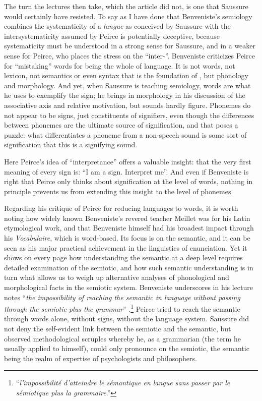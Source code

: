 \documentclass[output=paper]{langscibook}
\begin{document}
The turn the lectures then take, which the article did not, is one that Saussure would certainly have resisted. To say as I have done that Benveniste's semiology combines the systematicity of a \emph{langue} as conceived by Saussure with the intersystematicity assumed by Peirce is potentially deceptive, because systematicity must be understood in a strong sense for Saussure, and in a weaker sense for Peirce, who places the stress on the ``inter-''. Benveniste criticizes Peirce for ``mistaking'' words for being the whole of language. It is not words, not lexicon, not semantics or even syntax that is the foundation of , but phonology and morphology. And yet, when Saussure is teaching semiology, words are what he uses to exemplify the sign; he brings in morphology in his discussion of the associative axis and relative motivation, but sounds hardly figure. Phonemes do not appear to be signs, just constituents of signifiers, even though the differences between phonemes are the ultimate source of signification, and that poses a puzzle: what differentiates a phoneme from a non-speech sound is some sort of signification that this is a signifying sound.

Here Peirce's idea of ``interpretance'' offers a valuable insight: that the very first meaning of every sign is: ``I am a sign. Interpret me''. And even if Benveniste is right that Peirce only thinks about signification at the level of words, nothing in principle prevents us from extending this insight to the level of phonemes.

Regarding his critique of Peirce for reducing languages to words, it is worth noting how widely known Benveniste's revered teacher Meillet was for his Latin etymological work, and that Benveniste himself had his broadest impact through his \citeyear{Benveniste1969vocabulaire} \emph{Vocabulaire}, which is word-based. Its focus is on the semantic, and it can be seen as his major practical achievement in the linguistics of enunciation. Yet it shows on every page how understanding the semantic at a deep level requires detailed examination of the semiotic, and how such semantic understanding is in turn what allows us to weigh up alternative analyses of phonological and morphological facts in the semiotic system. Benveniste underscores in his lecture notes ``\emph{the impossibility of reaching the semantic in language without passing through the semiotic plus the grammar}'' \citep[114]{Benveniste1969vocabulaire}.\footnote{``\emph{l'impossibilité d'atteindre le sémantique en langue sans passer par le sémiotique plus la grammaire}.''} Peirce tried to reach the semantic through words alone, without signs, without the language system. Saussure did not deny the self-evident link between the semiotic and the semantic, but observed methodological scruples whereby he, as a grammarian (the term he usually applied to himself), could only pronounce on the semiotic, the semantic being the realm of expertise of psychologists and philosophers.
\end{document}
